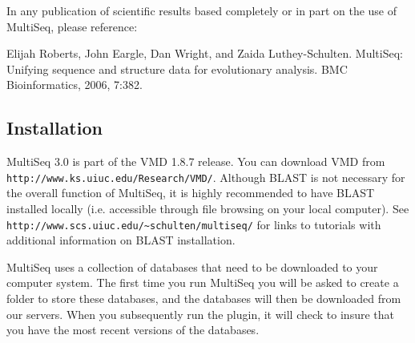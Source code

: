 In any publication of scientific results based completely or in part on
the use of MultiSeq, please reference:

Elijah Roberts, John Eargle, Dan Wright, and Zaida Luthey-Schulten.
MultiSeq: Unifying sequence and structure data for evolutionary
analysis.  BMC Bioinformatics, 2006, 7:382.


\subsection{Installation}
MultiSeq 3.0 is part of the VMD 1.8.7 release.  You can download VMD
from \texttt{http://www.ks.uiuc.edu/Research/VMD/}.  Although BLAST is
not necessary for the overall function of MultiSeq, it is highly
recommended to have BLAST installed locally (i.e. accessible through
file browsing on your local computer).  See
\texttt{http://www.scs.uiuc.edu/\~{}schulten/multiseq/} for links to
tutorials with additional information on BLAST installation.

MultiSeq uses a collection of databases that need to be downloaded to
your computer system.  The first time you run MultiSeq you
will be asked to create a folder to store these databases, and the
databases will then be downloaded from our servers.  When you
subsequently run the plugin, it will check to insure that you have the
most recent versions of the databases.




